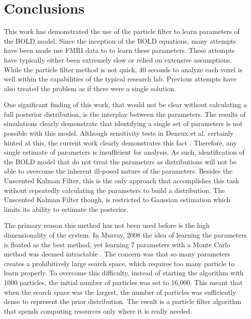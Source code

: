 \chapter{Conclusions}
\label{sec:Conclusion}
This work has demonstrated the use of the particle filter to
learn parameters of the BOLD model. Since the inception of the
BOLD equations, many attempts have been made use FMRI data to
to learn these parameters. These attempts have typically either been extremely
slow or relied on extensive assumptions. While the particle filter method
is not quick, 40 seconds to analyze each voxel is well within the capabilities
of the typical research lab. Previous attempts have also treated
the problem as if there were a single solution.

One significant finding of this work, that would not be clear without
calculating a full posterior distribution, is the interplay
between the parameters. The results of simulations clearly demonstrate
that identifying a single set of parameters is not possible with this
model. Although sensitivity tests in Deneux et al. certainly hinted
at this, the current work clearly demonstrates this fact \cite{Deneux2006}. Therefore,
any single estimate of parameters is insufficient for analysis. As such,
identification of the BOLD model that do not treat the parameters as distributions
will not be able to overcome the inherent ill-posed nature of the
parameters. Besides the Unscented Kalman Filter, this is the only approach
that accomplishes this task without repeatedly calculating the parameters
to build a distribution. The Unscented Kalman Filter though, is restricted
to Gaussian estimation which limits its ability to estimate the posterior.

The primary reason this method has not been used before is the high
dimensionality of the system. In Murray, 2008 the idea of learning
the parameters is floated as the best method, yet
learning 7 parameters with a Monte Carlo method was deemed intractable
\cite{Murray2008}. The
concern was that so many parameters creates a prohibitively large
search space, which requires too many particle to learn properly. To overcome
this difficulty, instead of starting the algorithm with 1000 particles,
the initial number of particles was set to 16,000. This meant that
when the search space was the largest, the number of particles was
sufficiently dense to represent the prior distribution. The result is
a particle filter algorithm that spends computing resources only where
it is really needed.

